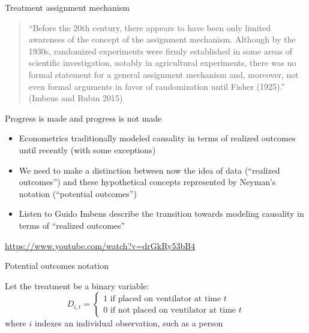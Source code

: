 \documentclass{beamer}
\begin{document}
\begin{frame}{Treatment assignment mechanism}

\begin{quote}

``Before the 20th century, there appears to have been only limited awareness of the concept of the assignment mechanism.  Although by the 1930s, randomized experiments were firmly established in some areas of scientific investigation, notably in agricultural experiments, there was no formal statement for a general assignment mechanism and, moreover, not even formal arguments in favor of randomization until Fisher (1925).'' (Imbens and Rubin 2015)

\end{quote}

\end{frame}

\begin{frame}{Progress is made and progress is not made}

\begin{itemize}

\item Econometrics traditionally modeled causality in terms of realized outcomes until recently (with some exceptions)
\item We need to make a distinction between now the idea of data (``realized outcomes'') and these hypothetical concepts represented by Neyman's notation (``potential outcomes'')
\item Listen to Guido Imbens describe the transition towards modeling causality in terms of ``realized outcomes''

\end{itemize}

\bigskip

\url{https://www.youtube.com/watch?v=drGkRy53bB4}

\end{frame}



\begin{frame}{Potential outcomes notation}

Let the treatment be a binary variable: $$D_{i,t} =\begin{cases} 1 \text{ if placed on ventilator at time $t$} \\ 0 \text{ if not placed on ventilator at time $t$} \end{cases}$$where $i$ indexes an individual observation, such as a person
\end{frame}
\end{document}

